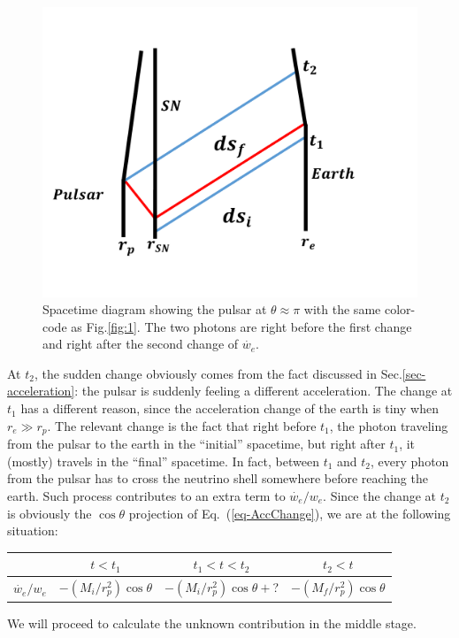 \documentclass[aps,showpacs,twocolumn,floats,prd,superscriptaddress,nofootinbib]{revtex4-1}
\begin{document}
\begin{figure}[tb]
\begin{center}
\includegraphics[scale = 0.3]{Image5.pdf}
\caption{Spacetime diagram showing the pulsar at $\theta \approx \pi$ with the same color-code as Fig.\ref{fig:1}. The two photons are right before the first change and right after the second change of $\dot{w_e}$.}
\label{fig-opposite}
\end{center}
\end{figure}

At $t_2$, the sudden change obviously comes from the fact discussed in Sec.\ref{sec-acceleration}: the pulsar is suddenly feeling a different acceleration. The change at $t_1$ has a different reason, since the acceleration change of the earth is tiny when $r_e\gg r_p$. The relevant change is the fact that right before $t_1$, the photon traveling from the pulsar to the earth in the ``initial'' spacetime, but right after $t_1$, it (mostly) travels in the ``final'' spacetime. In fact, between $t_1$ and $t_2$, every photon from the pulsar has to cross the neutrino shell somewhere before reaching the earth. Such process contributes to an extra term to $\dot{w_e}/w_e$. Since the change at $t_2$ is obviously the $\cos\theta$ projection of Eq.~(\ref{eq-AccChange}), we are at the following situation:
\begin{center}
\begin{tabular}{| c | c | c | c |} 
\hline
       & $t<t_1$ & $t_1<t<t_2$ & $t_2<t$ \\ 
       \hline 
$\dot{w_e}/w_e$ &  $-(M_i/r_p^2)\cos\theta$   & $-(M_i/r_p^2)\cos\theta+$?    
& $-(M_f/r_p^2)\cos\theta$   \\ 
\hline 
\end{tabular}
\end{center}
We will proceed to calculate the unknown contribution in the middle stage.
\end{document}
